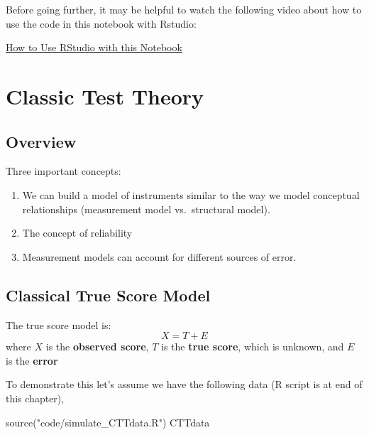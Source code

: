 \documentclass[
]{book}
\newenvironment{Shaded}{\begin{snugshade}}{\end{snugshade}}
\newcommand{\FunctionTok}[1]{\textcolor[rgb]{0.00,0.00,0.00}{#1}}
\newcommand{\NormalTok}[1]{#1}
\newcommand{\StringTok}[1]{\textcolor[rgb]{0.31,0.60,0.02}{#1}}
\providecommand{\tightlist}{%
  \setlength{\itemsep}{0pt}\setlength{\parskip}{0pt}}
\begin{document}
Before going further, it may be helpful to watch the following video about how to use the code in this notebook with Rstudio:

\href{https://auburn.hosted.panopto.com/Panopto/Pages/Viewer.aspx?id=13acb849-902a-45c7-bc4e-ad870153fcae}{How to Use RStudio with this Notebook}

\hypertarget{CCT}{%
\chapter{Classic Test Theory}\label{CCT}}

\hypertarget{overview}{%
\section{Overview}\label{overview}}

Three important concepts:

\begin{enumerate}
\def\labelenumi{\arabic{enumi}.}
\tightlist
\item
  We can build a model of instruments similar to the way we model conceptual relationships (measurement model vs.~structural model).
\item
  The concept of reliability
\item
  Measurement models can account for different sources of error.
\end{enumerate}

\hypertarget{classical-true-score-model}{%
\section{Classical True Score Model}\label{classical-true-score-model}}

The true score model is:
\[
X = T + E
\]
where \(X\) is the \textbf{observed score}, \(T\) is the \textbf{true score}, which is unknown, and \(E\) is the \textbf{error}

To demonstrate this let's assume we have the following data (R script is at end of this chapter),

\begin{Shaded}
\begin{Highlighting}[]
\FunctionTok{source}\NormalTok{(}\StringTok{"code/simulate\_CTTdata.R"}\NormalTok{)}
\NormalTok{CTTdata}
\end{Highlighting}
\end{Shaded}
\end{document}
